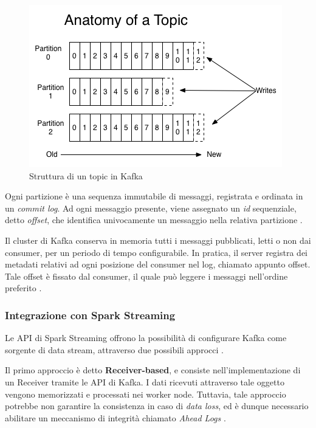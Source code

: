 \documentclass[12pt]{article}
\begin{document}
\begin{figure}[H]
	\centering
	\includegraphics[scale=0.80]{images/log_anatomy.png}
	\caption{Struttura di un topic in Kafka \cite{kafka}}
	\label{kafka-topic}
\end{figure}

Ogni partizione è una sequenza immutabile di messaggi, registrata e ordinata in un \textit{commit log}. Ad ogni messaggio presente, viene assegnato un \textit{id} sequenziale, detto \textit{offset}, che identifica univocamente un messaggio nella relativa partizione \cite{kafka}.

Il cluster di Kafka conserva in memoria tutti i messaggi pubblicati, letti o non dai consumer, per un periodo di tempo configurabile. In pratica, il server registra dei metadati relativi ad ogni posizione del consumer nel log, chiamato appunto offset. Tale offset è fissato dal consumer, il quale può leggere i messaggi nell'ordine preferito \cite{kafka}. 


\subsubsection{Integrazione con Spark Streaming}

Le API di Spark Streaming offrono la possibilità di configurare Kafka come sorgente di data stream, attraverso due possibili approcci \cite{spark}. 

Il primo approccio è detto \textbf{Receiver-based}, e consiste nell'implementazione di un Receiver tramite le API di Kafka. I dati ricevuti attraverso tale oggetto vengono memorizzati e processati nei worker node. Tuttavia, tale approccio potrebbe non garantire la consistenza in caso di \textit{data loss}, ed è dunque necessario abilitare un meccanismo di integrità chiamato \textit{Ahead Logs} \cite{spark}. \\
\end{document}
